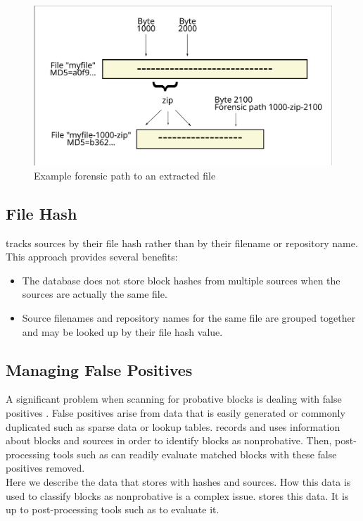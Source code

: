 \documentclass[11pt,fleqn]{article} %
\begin{document}
\begin{figure}
	\center
	\includegraphics[scale=.45]{drawings/forensic_path}
	\caption{Example forensic path to an extracted file}
	\label{fig:forensicPath}
\end{figure}

\subsection{File Hash}
\hdb tracks sources by their file hash rather than by their filename
or repository name.  This approach provides several benefits:

\begin{itemize}
\item The database does not store block hashes from multiple sources
when the sources are actually the same file.
\item Source filenames and repository names for the same file are grouped
together and may be looked up by their file hash value.
\end{itemize}

\subsection{Managing False Positives}
A significant problem when scanning for probative blocks is dealing with false positives \cite{hashBasedCarving}. False positives arise from data that is easily generated or commonly duplicated such as sparse data or lookup tables. \hdb records and uses information about blocks and sources in order to identify blocks as nonprobative. Then, post-processing tools such as \sscope can readily evaluate matched blocks with these false positives removed.\\

Here we describe the data that \hdb stores with hashes and sources. How this data is used to classify blocks as nonprobative is a complex issue. \hdb stores this data. It is up to post-processing tools such as \sscope to evaluate it.\\
\end{document}
